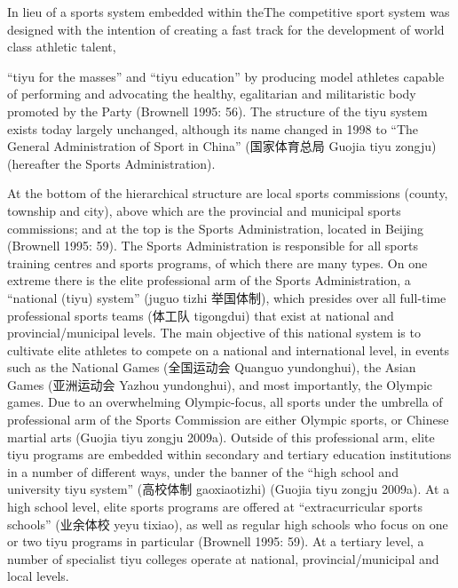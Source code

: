  In lieu of a sports system embedded within theThe competitive sport system was designed with the intention of creating a fast track for the development of world class athletic talent,


``tiyu for the masses'' and ``tiyu education'' by producing model athletes capable of performing and advocating the healthy, egalitarian and militaristic body promoted by the Party (Brownell 1995: 56).   The structure of the tiyu system exists today largely unchanged, although its name changed in 1998 to “The General Administration of Sport in China” (国家体育总局 Guojia tiyu zongju) (hereafter the Sports Administration).


At the bottom of the hierarchical structure are local sports commissions (county, township and city), above which are the provincial and municipal sports commissions; and at the top is the Sports Administration, located in Beijing (Brownell 1995: 59).  The Sports Administration is responsible for all sports training centres and sports programs, of which there are many types.  On one extreme there is the elite professional arm of the Sports Administration, a “national (tiyu) system” (juguo tizhi 举国体制), which
presides over all full-time professional sports teams (体工队 tigongdui) that exist at national and provincial/municipal levels.  The main objective of this national system is to cultivate elite athletes to compete on a national and international level, in events such as the National Games (全国运动会 Quanguo yundonghui), the Asian Games (亚洲运动会 Yazhou yundonghui), and most importantly, the Olympic games.  Due to an overwhelming Olympic-focus, all sports under the umbrella of professional arm of the Sports Commission are either Olympic sports, or Chinese martial arts (Guojia tiyu zongju 2009a).  Outside of this professional arm, elite tiyu programs are embedded within secondary and tertiary education institutions in a number of different ways, under the banner of the “high school and university tiyu system” (高校体制 gaoxiaotizhi) (Guojia tiyu zongju 2009a).  At a high school level, elite sports programs are offered at “extracurricular sports schools” (业余体校 yeyu tixiao), as well as regular high schools who focus on one or two tiyu programs in particular (Brownell 1995: 59). At a tertiary level, a number of specialist tiyu colleges operate at national, provincial/municipal and local levels.




